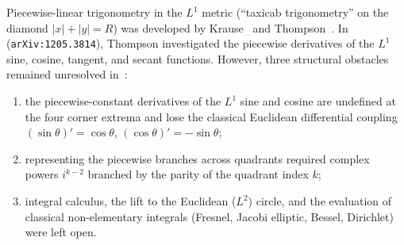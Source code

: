 \documentclass[11pt,a4paper]{article}
\theoremstyle{plain}
\theoremstyle{definition}
\begin{document}
Piecewise-linear trigonometry in the $L^1$ metric (``taxicab trigonometry'' on the diamond $|x|+|y|=R$) was developed by Krause~\cite{Krause1986} and Thompson~\cite{Thompson2011,Thompson2012}. In~\cite{Thompson2012} (\texttt{arXiv:1205.3814}), Thompson investigated the piecewise derivatives of the $L^1$ sine, cosine, tangent, and secant functions. However, three structural obstacles remained unresolved in~\cite{Thompson2012}:
\begin{enumerate}[leftmargin=*,noitemsep]
\item the piecewise-constant derivatives of the $L^1$ sine and cosine are undefined at the four corner extrema and lose the classical Euclidean differential coupling $(\sin\theta)'=\cos\theta$, $(\cos\theta)'=-\sin\theta$;
\item representing the piecewise branches across quadrants required complex powers $i^{k-2}$ branched by the parity of the quadrant index $k$;
\item integral calculus, the lift to the Euclidean ($L^2$) circle, and the evaluation of classical non-elementary integrals (Fresnel, Jacobi elliptic, Bessel, Dirichlet) were left open.
\end{enumerate}
\end{document}
